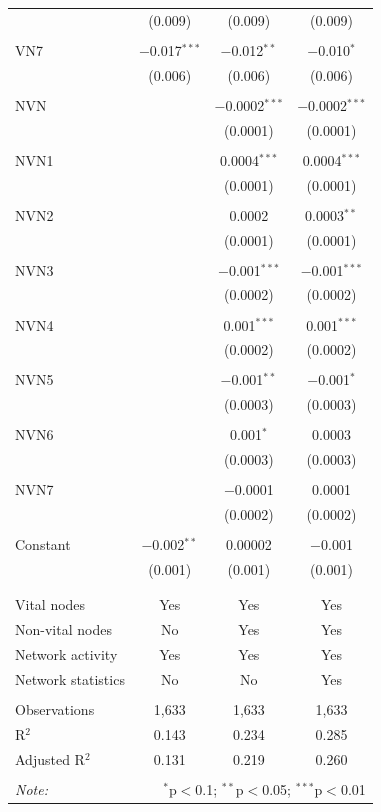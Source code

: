 \begin{table}[!htbp]
\begin{tabular}{@{\extracolsep{5pt}}lccc}
  & (0.009) & (0.009) & (0.009) \\ 
  & & & \\ 
 VN7 & $-$0.017$^{***}$ & $-$0.012$^{**}$ & $-$0.010$^{*}$ \\ 
  & (0.006) & (0.006) & (0.006) \\ 
  & & & \\ 
 NVN &  & $-$0.0002$^{***}$ & $-$0.0002$^{***}$ \\ 
  &  & (0.0001) & (0.0001) \\ 
  & & & \\ 
 NVN1 &  & 0.0004$^{***}$ & 0.0004$^{***}$ \\ 
  &  & (0.0001) & (0.0001) \\ 
  & & & \\ 
 NVN2 &  & 0.0002 & 0.0003$^{**}$ \\ 
  &  & (0.0001) & (0.0001) \\ 
  & & & \\ 
 NVN3 &  & $-$0.001$^{***}$ & $-$0.001$^{***}$ \\ 
  &  & (0.0002) & (0.0002) \\ 
  & & & \\ 
 NVN4 &  & 0.001$^{***}$ & 0.001$^{***}$ \\ 
  &  & (0.0002) & (0.0002) \\ 
  & & & \\ 
 NVN5 &  & $-$0.001$^{**}$ & $-$0.001$^{*}$ \\ 
  &  & (0.0003) & (0.0003) \\ 
  & & & \\ 
 NVN6 &  & 0.001$^{*}$ & 0.0003 \\ 
  &  & (0.0003) & (0.0003) \\ 
  & & & \\ 
 NVN7 &  & $-$0.0001 & 0.0001 \\ 
  &  & (0.0002) & (0.0002) \\ 
  & & & \\ 
 Constant & $-$0.002$^{**}$ & 0.00002 & $-$0.001 \\ 
  & (0.001) & (0.001) & (0.001) \\ 
  & & & \\ 
\hline \\[-1.8ex] 
Vital nodes & Yes & Yes & Yes \\ 
Non-vital nodes & No & Yes & Yes \\ 
Network activity & Yes & Yes & Yes \\ 
Network statistics & No & No & Yes \\ 
\hline &  &  &  \\ 
Observations & 1,633 & 1,633 & 1,633 \\ 
R$^{2}$ & 0.143 & 0.234 & 0.285 \\ 
Adjusted R$^{2}$ & 0.131 & 0.219 & 0.260 \\ 
\hline 
\hline \\[-1.8ex] 
\textit{Note:}  & \multicolumn{3}{r}{$^{*}$p$<$0.1; $^{**}$p$<$0.05; $^{***}$p$<$0.01} \\ 
\end{tabular} 
\end{table} 
